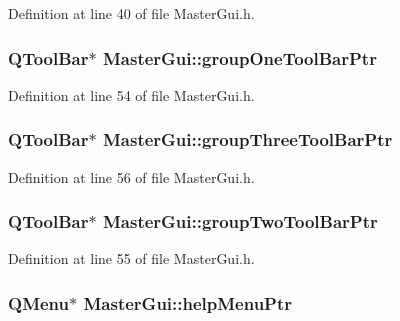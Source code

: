 Definition at line 40 of file Master\-Gui.\-h.

\hypertarget{class_master_gui_a67441e41e16e245976536f18cd7f2d6d}{
\subsubsection[{group\-One\-Tool\-Bar\-Ptr}]{\setlength{\rightskip}{0pt plus 5cm}Q\-Tool\-Bar$\ast$ Master\-Gui\-::group\-One\-Tool\-Bar\-Ptr\hspace{0.3cm}{\ttfamily [private]}}}\label{class_master_gui_a67441e41e16e245976536f18cd7f2d6d}


Definition at line 54 of file Master\-Gui.\-h.

\hypertarget{class_master_gui_af620c7fd8a0903c84581a657d23ef45b}{
\subsubsection[{group\-Three\-Tool\-Bar\-Ptr}]{\setlength{\rightskip}{0pt plus 5cm}Q\-Tool\-Bar$\ast$ Master\-Gui\-::group\-Three\-Tool\-Bar\-Ptr\hspace{0.3cm}{\ttfamily [private]}}}\label{class_master_gui_af620c7fd8a0903c84581a657d23ef45b}


Definition at line 56 of file Master\-Gui.\-h.

\hypertarget{class_master_gui_aa2c7522e568a43f38861795af343bf76}{
\subsubsection[{group\-Two\-Tool\-Bar\-Ptr}]{\setlength{\rightskip}{0pt plus 5cm}Q\-Tool\-Bar$\ast$ Master\-Gui\-::group\-Two\-Tool\-Bar\-Ptr\hspace{0.3cm}{\ttfamily [private]}}}\label{class_master_gui_aa2c7522e568a43f38861795af343bf76}


Definition at line 55 of file Master\-Gui.\-h.

\hypertarget{class_master_gui_a4125e9702c79a263642bf83f5f1e2192}{
\subsubsection[{help\-Menu\-Ptr}]{\setlength{\rightskip}{0pt plus 5cm}Q\-Menu$\ast$ Master\-Gui\-::help\-Menu\-Ptr\hspace{0.3cm}{\ttfamily [private]}}}\label{class_master_gui_a4125e9702c79a263642bf83f5f1e2192}



